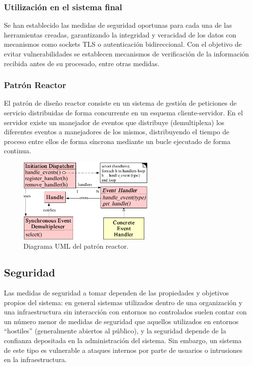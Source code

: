 \subsubsection{Utilización en el sistema final}

Se han establecido las medidas de seguridad oportunas para cada una de las herramientas creadas, garantizando la integridad y veracidad de los datos con mecanismos como sockets TLS o autenticación bidireccional. Con el objetivo de evitar vulnerabilidades se establecen mecanismos de verificación de la información recibida antes de su procesado, entre otras medidas.

\subsubsection{Patrón Reactor}

El patrón de diseño reactor\cite{Coplien95reactor} consiste en un sistema de gestión de peticiones de servicio distribuidas de forma concurrente en un esquema cliente-servidor. En el servidor existe un manejador de eventos que distribuye (demultiplexa) los diferentes eventos a manejadores de los mismos, distribuyendo el tiempo de proceso entre ellos de forma síncrona mediante un bucle ejecutado de forma continua.

\begin{figure}[H]
  \centering
  \includegraphics[width=0.6\textwidth]{Chapter2/Figures/reactoruml}
  \caption[Diagrama UML del patrón reactor]{Diagrama UML del patrón reactor\label{Coplien95reactor}.}
  \label{fig:reactoruml}
\end{figure}\subsection{Seguridad}

Las medidas de seguridad a tomar dependen de las propiedades y objetivos propios del sistema: en general sistemas utilizados dentro de una organización y una infraestructura sin interacción con entornos no controlados suelen contar con un número menor de medidas de seguridad que aquellos utilizados en entornos ``hostiles'' (generalmente abiertos al público), y la seguridad depende de la confianza depositada en la administración del sistema. Sin embargo, un sistema de este tipo es vulnerable a ataques internos por parte de usuarios o intrusiones en la infraestructura.

